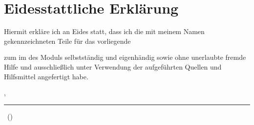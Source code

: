 %
\section*{Eidesstattliche Erklärung}
Hiermit erkläre ich an Eides statt, dass ich die mit meinem Namen gekennzeichneten Teile für das vorliegende \textit{\art}
\bigskip
%
\begin{center}
  \large{\textsc{\titel}}
\end{center}
%
\bigskip
zum \textit{\termin} im \textit{\veranstaltung} des Moduls \textit{\modul} selbstständig und eigenhändig sowie ohne unerlaubte fremde Hilfe und ausschließlich unter Verwendung der aufgeführten Quellen und Hilfsmittel angefertigt habe.

\bigskip

\ort , \abgabedatumKurz

\bigskip
\bigskip

\rule[-0.2cm]{8cm}{0.5pt}

\textsc{\autorA\ (\matrikelnrA)}
%
%
%
%
%

%
%
%
\newpage